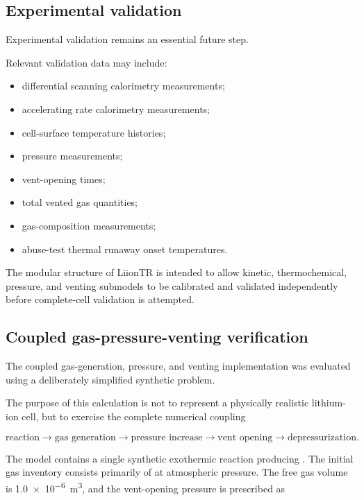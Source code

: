 \subsection{Experimental validation}

Experimental validation remains an essential future step.

Relevant validation data may include:

\begin{itemize}
    \item differential scanning calorimetry measurements;
    \item accelerating rate calorimetry measurements;
    \item cell-surface temperature histories;
    \item pressure measurements;
    \item vent-opening times;
    \item total vented gas quantities;
    \item gas-composition measurements;
    \item abuse-test thermal runaway onset temperatures.
\end{itemize}

The modular structure of LiionTR is intended to allow kinetic,
thermochemical, pressure, and venting submodels to be calibrated and
validated independently before complete-cell validation is attempted.

\subsection{Coupled gas-pressure-venting verification}

The coupled gas-generation, pressure, and venting implementation was
evaluated using a deliberately simplified synthetic problem.

The purpose of this calculation is not to represent a physically
realistic lithium-ion cell, but to exercise the complete numerical
coupling

\begin{equation}
    \text{reaction}
    \rightarrow
    \text{gas generation}
    \rightarrow
    \text{pressure increase}
    \rightarrow
    \text{vent opening}
    \rightarrow
    \text{depressurization}.
\end{equation}

The model contains a single synthetic exothermic reaction producing
. The initial gas inventory consists primarily of  at
atmospheric pressure. The free gas volume is
\SI{1.0e-6}{\meter\cubed}, and the vent-opening pressure is prescribed as

